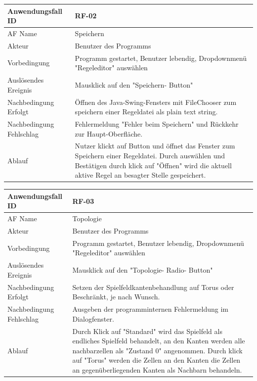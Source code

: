 \documentclass[11pt,a4paper]{article}
\begin{document}
     \begin{tabular}[m]{|m{7cm}|m{9cm}|}
          \hline
          Anwendungsfall ID     & RF-02 \\ %
          \hline
          AF Name     &  Speichern \\
          \hline
          Akteur&Benutzer des Programms \\
          \hline
          Vorbedingung&Programm gestartet, Benutzer lebendig, Dropdownmenü "Regeleditor" auswählen\\
          \hline
          Auslösendes Ereignis&Mausklick auf den "Speichern- Button"\\
          \hline
          Nachbedingung Erfolgt&Öffnen des Java-Swing-Fensters mit FileChooser zum speichern einer Regeldatei als plain text string.\\
          \hline
          Nachbedingung Fehlschlag&Fehlermeldung "Fehler beim Speichern" und Rückkehr zur Haupt-Oberfläche.\\
          \hline
          Ablauf&Nutzer klickt auf Button und öffnet das Fenster zum Speichern einer Regeldatei. Durch auswählen und Bestätigen durch klick auf "Öffnen" wird die aktuell aktive Regel an besagter Stelle gespeichert.\\
          \hline
     \end{tabular}
     \par

	\begin{tabular}[m]{|m{7cm}|m{9cm}|}
		\hline
		Anwendungsfall ID     & RF-03 \\ %
		\hline
		AF Name     &  Topologie \\
		\hline
		Akteur&Benutzer des Programms \\
		\hline
		Vorbedingung&Programm gestartet, Benutzer lebendig, Dropdownmenü "Regeleditor" auswählen\\
		\hline
		Auslösendes Ereignis&Mausklick auf den "Topologie- Radio- Button"\\
		\hline
		Nachbedingung Erfolgt&Setzen der Spielfeldkantenbehandlung auf Torus oder Beschränkt, je nach Wunsch.\\
		\hline
		Nachbedingung Fehlschlag&Ausgeben der programminternen Fehlermeldung im Dialogfenster.\\
		\hline
		Ablauf&Durch Klick auf "Standard" wird das Spielfeld als endliches Spielfeld behandelt, an den Kanten werden alle nachbarzellen als "Zustand 0" angenommen.
		Durch klick auf "Torus" werden die Zellen an den Kanten die Zellen an gegenüberliegenden Kanten als Nachbarn behandeln.\\
		\hline
	\end{tabular}
	
\end{document}
